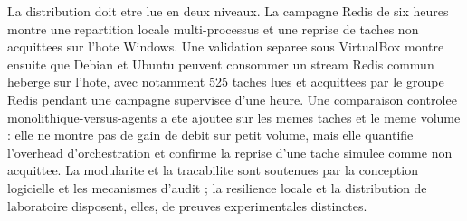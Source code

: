 La distribution doit etre lue en deux niveaux. La campagne Redis de six heures montre une repartition locale multi-processus et une reprise de taches non acquittees sur l'hote Windows. Une validation separee sous VirtualBox montre ensuite que Debian et Ubuntu peuvent consommer un stream Redis commun heberge sur l'hote, avec notamment 525 taches lues et acquittees par le groupe Redis pendant une campagne supervisee d'une heure. Une comparaison controlee monolithique-versus-agents a ete ajoutee sur les memes taches et le meme volume : elle ne montre pas de gain de debit sur petit volume, mais elle quantifie l'overhead d'orchestration et confirme la reprise d'une tache simulee comme non acquittee. La modularite et la tracabilite sont soutenues par la conception logicielle et les mecanismes d'audit ; la resilience locale et la distribution de laboratoire disposent, elles, de preuves experimentales distinctes.

